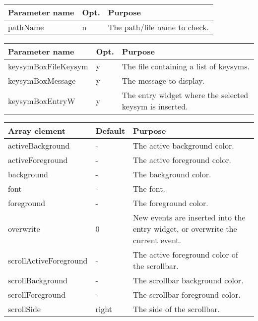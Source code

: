 {\newpage
\clearpage
\samepage \begin{figure}[ht]
  \centerline{
  \epsfysize=4cm
  }

  \label{fig:InputBox}
\end{figure}
}

{\newpage
\clearpage
\samepage \begin{tabular}{|l|l|p{6.5cm}|} \hline
Parameter name & Opt. & Purpose \\  \hline
pathName       & n    & The path/file name to check. \\
                        \hline
\end{tabular}
}

{\newpage
\clearpage
\samepage \begin{tabular}{|l|l|p{6cm}|} \hline
Parameter name      & Opt. & Purpose\\  \hline
keysymBoxFileKeysym & y    & The file containing a list of
                             keysyms.\\  \hline
keysymBoxMessage    & y    & The message to display.\\  \hline
keysymBoxEntryW     & y    & The entry widget where the
                             selected keysym is inserted.\\  \hline
\end{tabular}
}

{\newpage
\clearpage
\samepage \begin{tabular}{|l|l|p{5.5cm}|} \hline
Array element          & Default & Purpose\\  \hline
activeBackground       & -       & The active background
                                   color.\\  \hline
activeForeground       & -       & The active foreground
                                   color.\\  \hline
background             & -       & The background color.\\  \hline
font                   & -       & The font. \\  \hline
foreground             & -       & The foreground color.\\  \hline
overwrite              & 0       & New events are inserted
                                   into the entry widget, or
                                   overwrite the current
                                   event.\\  \hline
scrollActiveForeground & -       & The active foreground
                                   color of the scrollbar.\\  \hline
scrollBackground       & -       & The scrollbar background
                                   color.\\  \hline
scrollForeground       & -       & The scrollbar foreground
                                   color.\\  \hline
scrollSide             & right   & The side of the
                                   scrollbar.\\  \hline
\end{tabular}
}

